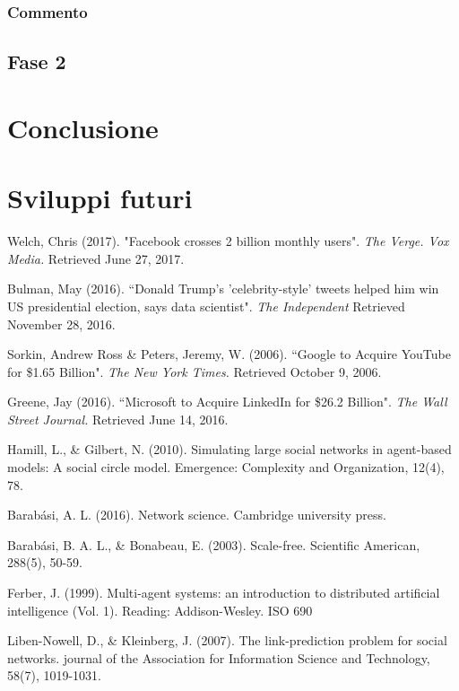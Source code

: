\documentclass[a4paper,12pt]{article}
\begin{document}
\subsubsection{Commento}
\subsection{Fase 2}
\section{Conclusione}
\label{sec:end}
\section{Sviluppi futuri}
\label{sec:future}


\begin{thebibliography}{9}
  Welch, Chris (2017). "Facebook crosses 2 billion monthly users". \textit{The Verge. Vox Media.} Retrieved June 27, 2017.
  
  Bulman, May (2016). ``Donald Trump's 'celebrity-style' tweets helped him win US presidential election, says data scientist".
\textit{The Independent} Retrieved November 28, 2016.

   Sorkin, Andrew Ross \& Peters, Jeremy, W. (2006). ``Google to Acquire YouTube for \$1.65 Billion". \textit{The New York Times.} Retrieved October 9, 2006.

   Greene, Jay (2016). ``Microsoft to Acquire LinkedIn for \$26.2 Billion". \textit{The Wall Street Journal.} Retrieved June 14, 2016.

  Hamill, L., \& Gilbert, N. (2010). Simulating large social networks in agent-based models: A social circle model. Emergence: Complexity and Organization, 12(4), 78.

  Barabási, A. L. (2016). Network science. Cambridge university press.
  
  Barabási, B. A. L., \& Bonabeau, E. (2003). Scale-free. Scientific American, 288(5), 50-59.
  
  Ferber, J. (1999). Multi-agent systems: an introduction to distributed artificial intelligence (Vol. 1). Reading: Addison-Wesley.
ISO 690	

  Liben-Nowell, D., \& Kleinberg, J. (2007). The link-prediction problem for social networks. journal of the Association for Information Science and Technology, 58(7), 1019-1031.
  

\end{thebibliography}
\end{document}
